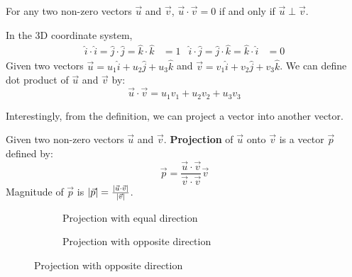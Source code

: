 \documentclass{huhtakm-template-book}
\begin{document}
\begin{thm}
    For any two non-zero vectors $\vec{u}$ and $\vec{v}$, $\vec{u}\cdot\vec{v}=0$ if and only if $\vec{u}\perp\vec{v}$.
\end{thm}
\begin{lem}
    In the 3D coordinate system,
    \begin{align*}
        \hat{i}\cdot\hat{i}=\hat{j}\cdot\hat{j}=\hat{k}\cdot\hat{k}&=1 & \hat{i}\cdot\hat{j}=\hat{j}\cdot\hat{k}=\hat{k}\cdot\hat{i}&=0
    \end{align*}
    Given two vectors $\vec{u}=u_{1}\hat{i}+u_{2}\hat{j}+u_{3}\hat{k}$ and $\vec{v}=v_{1}\hat{i}+v_{2}\hat{j}+v_{3}\hat{k}$. We can define dot product of $\vec{u}$ and $\vec{v}$ by:
    \begin{equation*}
        \vec{u}\cdot\vec{v}=u_{1}v_{1}+u_{2}v_{2}+u_{3}v_{3}
    \end{equation*}
\end{lem}
\newpage
Interestingly, from the definition, we can project a vector into another vector.
\begin{defn}
    Given two non-zero vectors $\vec{u}$ and $\vec{v}$. \textbf{Projection} of $\vec{u}$ onto $\vec{v}$ is a vector $\vec{p}$ defined by:
    \begin{equation*}
        \vec{p}=\frac{\vec{u}\cdot\vec{v}}{\vec{v}\cdot\vec{v}}\vec{v}
    \end{equation*}
    Magnitude of $\vec{p}$ is $\left|{\vec{p}}\right|=\frac{\left|{\vec{u}\cdot\vec{v}}\right|}{\left|{\vec{v}}\right|}$.
\end{defn}
\begin{figure}[h!]
    \centering
    \begin{subfigure}{0.45\textwidth}
        \centering
        \caption{Projection with equal direction}
        \label{fig:positive projection}
    \end{subfigure}
    \begin{subfigure}{0.45\textwidth}
        \centering
        \caption{Projection with opposite direction}
        \label{fig:negative projection}
    \end{subfigure}
\end{figure}
\end{document}
